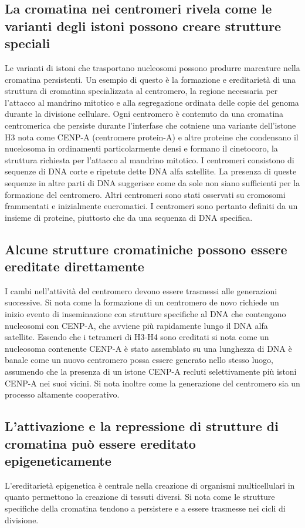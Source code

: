 \subsection{La cromatina nei centromeri rivela come le varianti degli istoni possono creare strutture speciali}
Le varianti di istoni che trasportano nucleosomi possono produrre marcature nella cromatina persistenti. Un esempio di questo \`e la formazione e ereditariet\`a di una struttura di 
cromatina specializzata al centromero, la regione necessaria per l'attacco al mandrino mitotico e alla segregazione ordinata delle copie del genoma durante la divisione cellulare. Ogni
centromero \`e contenuto da una cromatina centromerica che persiste durante l'interfase che cotniene una variante dell'istone H3 nota come CENP-A (centromere protein-A) e altre 
proteine che condensano il nucelosoma in ordinamenti particolarmente densi e formano il cinetocoro, la struttura richiesta per l'attacco al mandrino mitotico. I centromeri consistono 
di sequenze di DNA corte e ripetute dette DNA alfa satellite. La presenza di queste sequenze in altre parti di DNA suggerisce come da sole non siano sufficienti per la formazione 
del centromero. Altri centromeri sono stati osservati su cromosomi frammentati e inizialmente eucromatici. I centromeri sono pertanto definiti da un insieme di proteine, piuttosto che
da una sequenza di DNA specifica. 
\subsection{Alcune strutture cromatiniche possono essere ereditate direttamente}
I cambi nell'attivit\`a del centromero devono essere trasmessi alle generazioni successive. Si nota come la formazione di un centromero de novo richiede un inizio evento di 
inseminazione con strutture specifiche al DNA che contengono nucleosomi con CENP-A, che avviene pi\`u rapidamente lungo il DNA alfa satellite. Essendo che i tetrameri di H3-H4 sono
ereditati si nota come un nucleosoma contenente CENP-A \`e stato assemblato su una lunghezza di DNA \`e banale come un nuovo centromero possa essere generato nello stesso luogo, 
assumendo che la presenza di un istone CENP-A recluti selettivamente pi\`u istoni CENP-A nei suoi vicini. Si nota inoltre come la generazione del centromero sia un processo altamente 
cooperativo.
\subsection{L'attivazione e la repressione di strutture di cromatina pu\`o essere ereditato epigeneticamente}
L'ereditariet\`a epigenetica \`e centrale nella creazione di organismi multicellulari in quanto permettono la creazione di tessuti diversi. Si nota come le strutture specifiche della
cromatina tendono a persistere e a essere trasmesse nei cicli di divisione.
